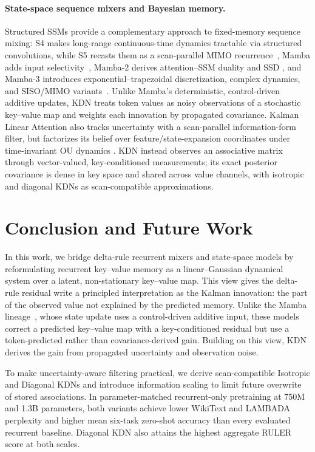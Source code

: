 \documentclass[11pt,letterpaper,logo]{yalearxiv}
\begin{document}
\paragraph{State-space sequence mixers and Bayesian memory.}
Structured SSMs provide a complementary approach to fixed-memory sequence mixing: S4 makes long-range continuous-time dynamics
tractable via structured convolutions, while S5 recasts them as a scan-parallel MIMO
recurrence~\citep{gu2022efficiently,smith2023simplified},
Mamba adds input selectivity~\citep{gu2023mamba}, Mamba-2 derives attention--SSM duality and SSD
\citep{dao2024transformers}, and Mamba-3 introduces exponential--trapezoidal discretization, complex
dynamics, and SISO/MIMO variants~\citep{lahoti2026mamba3}. Unlike Mamba's deterministic,
control-driven additive updates, KDN treats token values as noisy observations of a stochastic
key--value map and weights each innovation by propagated covariance. Kalman Linear Attention also
tracks uncertainty with a scan-parallel information-form filter, but factorizes its belief over
feature/state-expansion coordinates under time-invariant OU dynamics
\citep{shaj2026kalmanlinearattention}. KDN instead observes an associative matrix through
vector-valued, key-conditioned measurements; its exact posterior covariance is dense in key space
and shared across value channels, with isotropic and diagonal KDNs as scan-compatible approximations.

\section{Conclusion and Future Work}
\label{sec:discussion-conclusion}

In this work, we bridge delta-rule recurrent mixers and state-space models by reformulating recurrent
key--value memory as a linear--Gaussian dynamical system over a latent, non-stationary key--value
map. This view gives the delta-rule residual write a principled interpretation as the Kalman
innovation: the part of the observed value not explained by the predicted memory. Unlike the Mamba
lineage~\citep{gu2023mamba}, whose state update uses a control-driven additive input, these models
correct a predicted key--value map with a key-conditioned residual but use a token-predicted rather
than covariance-derived gain. Building on this view, KDN derives the gain from propagated
uncertainty and observation noise.

To make uncertainty-aware filtering practical, we derive scan-compatible Isotropic and Diagonal KDNs and introduce information scaling to limit future overwrite of stored associations. In parameter-matched recurrent-only pretraining at 750M and 1.3B parameters, both variants achieve lower WikiText and LAMBADA perplexity and higher mean six-task zero-shot accuracy than every evaluated recurrent baseline. Diagonal KDN also attains the highest aggregate RULER score at both scales.
\end{document}
